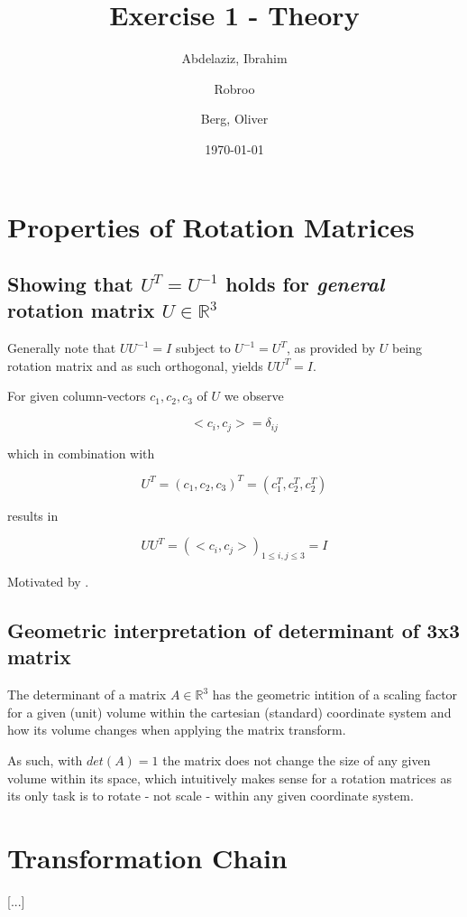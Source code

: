 \documentclass[a4paper, twoside, english]{article}
\title{Exercise 1 - Theory}
\author{
	Abdelaziz, Ibrahim
	\and
	Robroo
	\and
	Berg, Oliver
}
\date{\today}
\begin{document}
\maketitle


\section{Properties of Rotation Matrices}

\subsection{Showing that $U^T = U^{-1}$ holds for \textit{general} rotation matrix $U \in \mathbb{R}^3$}

Generally note that $UU^{-1}=I$ subject to $U^{-1} = U^T$, as provided by $U$ being rotation matrix and as such orthogonal, yields $UU^T = I$.

For given column-vectors $c_1, c_2, c_3$ of $U$ we observe 

\begin{equation*}
	<c_i, c_j> = \delta_{i j}
\end{equation*}

which in combination with

\begin{equation*}
	U^T = (c_1, c_2, c_3)^T = (c_1^T, c_2^T, c_2^T)
\end{equation*}

results in

\begin{equation*}
	UU^T = (<c_i, c_j>)_{1 \le i, j \le 3} = I
\end{equation*}

Motivated by \cite{MathematicsSEMatrixTransposeIdentity}\cite{MathematicsSEMatrixTransposeIdentity2}\cite{WikiOrthogonaleMatrix}.

\subsection{Geometric interpretation of determinant of 3x3 matrix}

The determinant of a matrix $A \in \mathbb{R}^3$ has the geometric intition of a scaling factor for a given (unit) volume within the cartesian (standard) coordinate system and how its volume changes when applying the matrix transform. \cite{3blue1brownLinAlg5Determinant}

As such, with $det(A) = 1$ the matrix does not change the size of any given volume within its space, which intuitively makes sense for a rotation matrices as its only task is to rotate - not scale - within any given coordinate system.


\section{Transformation Chain}

[...]




\end{document}
